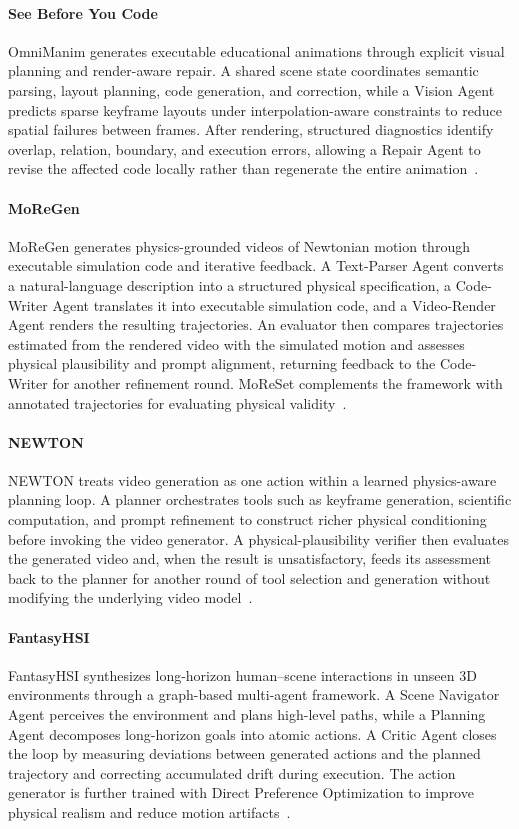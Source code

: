 \paragraph{See Before You Code}
OmniManim generates executable educational animations through explicit visual planning and render-aware repair. A shared scene state coordinates semantic parsing, layout planning, code generation, and correction, while a Vision Agent predicts sparse keyframe layouts under interpolation-aware constraints to reduce spatial failures between frames. After rendering, structured diagnostics identify overlap, relation, boundary, and execution errors, allowing a Repair Agent to revise the affected code locally rather than regenerate the entire animation~\cite{avg260515585}.

\paragraph{MoReGen}
MoReGen generates physics-grounded videos of Newtonian motion through executable simulation code and iterative feedback. A Text-Parser Agent converts a natural-language description into a structured physical specification, a Code-Writer Agent translates it into executable simulation code, and a Video-Render Agent renders the resulting trajectories. An evaluator then compares trajectories estimated from the rendered video with the simulated motion and assesses physical plausibility and prompt alignment, returning feedback to the Code-Writer for another refinement round. MoReSet complements the framework with annotated trajectories for evaluating physical validity~\cite{avg251204221}.

\paragraph{NEWTON}
NEWTON treats video generation as one action within a learned physics-aware planning loop. A planner orchestrates tools such as keyframe generation, scientific computation, and prompt refinement to construct richer physical conditioning before invoking the video generator. A physical-plausibility verifier then evaluates the generated video and, when the result is unsatisfactory, feeds its assessment back to the planner for another round of tool selection and generation without modifying the underlying video model~\cite{feng2026newton}.

\paragraph{FantasyHSI}
FantasyHSI synthesizes long-horizon human--scene interactions in unseen 3D environments through a graph-based multi-agent framework. A Scene Navigator Agent perceives the environment and plans high-level paths, while a Planning Agent decomposes long-horizon goals into atomic actions. A Critic Agent closes the loop by measuring deviations between generated actions and the planned trajectory and correcting accumulated drift during execution. The action generator is further trained with Direct Preference Optimization to improve physical realism and reduce motion artifacts~\cite{avg250901232}.

